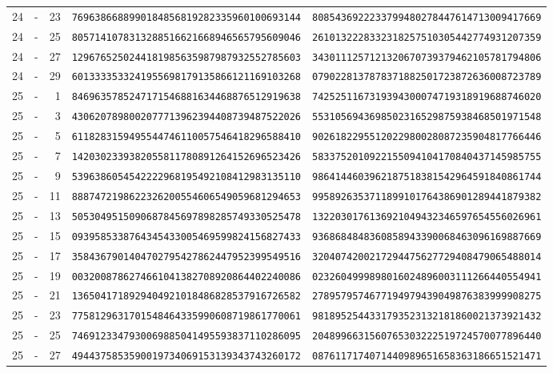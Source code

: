 \begin{longtable}{@{}rcrll@{}}
24&-&23&\texttt{7696386688990184856819282335960100693144}&\texttt{8085436922233799480278447614713009417669}\\
24&-&25&\texttt{8057141078313288516621668946565795609046}&\texttt{2610132228332318257510305442774931207359}\\
24&-&27&\texttt{1296765250244181985635987987932552785603}&\texttt{3430111257121320670739379462105781794806}\\
24&-&29&\texttt{6013333533241955698179135866121169103268}&\texttt{0790228137878371882501723872636008723789}\\
25&-&1&\texttt{8469635785247171546881634468876512919638}&\texttt{7425251167319394300074719318919688746020}\\
25&-&3&\texttt{4306207898002077713962394408739487522026}&\texttt{5531056943698502316529875938468501971548}\\
25&-&5&\texttt{6118283159495544746110057546418296588410}&\texttt{9026182295512022980028087235904817766446}\\
25&-&7&\texttt{1420302339382055811780891264152696523426}&\texttt{5833752010922155094104170840437145985755}\\
25&-&9&\texttt{5396386054542222968195492108412983135110}&\texttt{9864144603962187518381542964591840861744}\\
25&-&11&\texttt{8887472198622326200554606549059681294653}&\texttt{9958926353711899101764386901289441879382}\\
25&-&13&\texttt{5053049515090687845697898285749330525478}&\texttt{1322030176136921049432346597654556026961}\\
25&-&15&\texttt{0939585338764345433005469599824156827433}&\texttt{9368684848360858943390068463096169887669}\\
25&-&17&\texttt{3584367901404702795427862447952399549516}&\texttt{3204074200217294475627729408479065488014}\\
25&-&19&\texttt{0032008786274661041382708920864402240086}&\texttt{0232604999898016024896003111266440554941}\\
25&-&21&\texttt{1365041718929404921018486828537916726582}&\texttt{2789579574677194979439049876383999908275}\\
25&-&23&\texttt{7758129631701548464335990608719861770061}&\texttt{9818952544331793523132181860021373921432}\\
25&-&25&\texttt{7469123347930069885041495593837110286095}&\texttt{2048996631560765303222519724570077896440}\\
25&-&27&\texttt{4944375853590019734069153139343743260172}&\texttt{0876117174071440989651658363186651521471}\\

\end{longtable}

